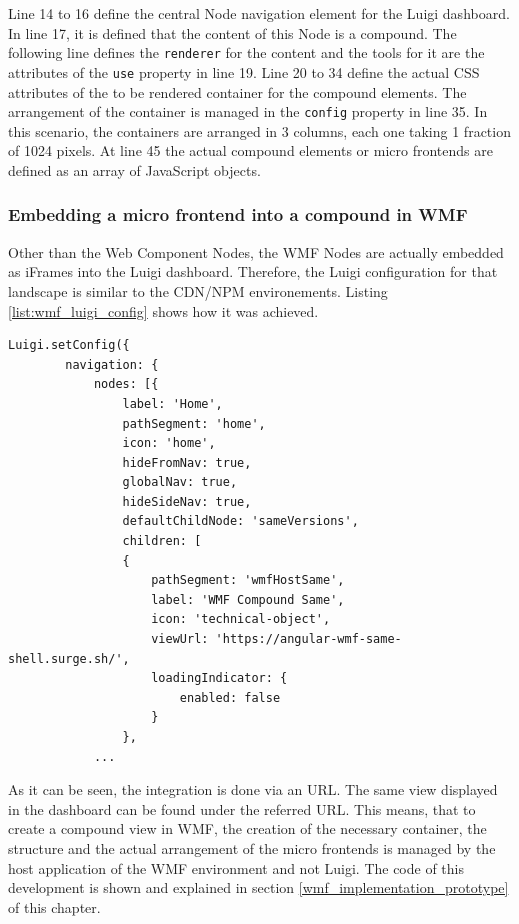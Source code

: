 Line 14 to 16 define the central Node navigation element for the Luigi dashboard. 
In line 17, it is defined that the content of this Node is a compound. 
The following line defines the \texttt{renderer} for the content and the tools for it are the attributes of the \texttt{use} property in line 19. 
Line 20 to 34 define the actual CSS attributes of the to be rendered container for the compound elements. 
The arrangement of the container  is managed in the \texttt{config} property in line 35. 
In this scenario, the containers are arranged in 3 columns, each one taking 1 fraction of 1024 pixels.
At line 45 the actual compound elements or micro frontends are defined as an array of JavaScript objects.

\subsubsection{Embedding a micro frontend into a compound in WMF}
\label{embedd_mfe_in_wmf}

Other than the Web Component Nodes, the WMF Nodes are actually embedded as iFrames into the Luigi dashboard.
Therefore, the Luigi configuration for that landscape is similar to the CDN/NPM environements. 
Listing \ref{list:wmf_luigi_config} shows how it was achieved.

\begin{lstlisting}[caption=Example configuration to embed a WMF micro frontend compound as a Node in Luigi, label=list:wmf_luigi_config,  xleftmargin=.0\textwidth, xrightmargin=.0\textwidth]
	Luigi.setConfig({
		navigation: {
			nodes: [{
				label: 'Home',
				pathSegment: 'home',
				icon: 'home',
				hideFromNav: true,
				globalNav: true,
				hideSideNav: true,
				defaultChildNode: 'sameVersions',
				children: [
                {
					pathSegment: 'wmfHostSame',
					label: 'WMF Compound Same',
					icon: 'technical-object',
					viewUrl: 'https://angular-wmf-same-shell.surge.sh/',
					loadingIndicator: {
						enabled: false
					}
				},
			...
\end{lstlisting}

As it can be seen, the integration is done via an URL. 
The same view displayed in the dashboard can be found under the referred URL. 
This means, that to create a compound view in WMF, the creation of the necessary container, the structure and the actual arrangement of the micro frontends is managed by the host application of the WMF environment and not Luigi.
The code of this development is shown and explained in section \ref{wmf_implementation_prototype} of this chapter.

